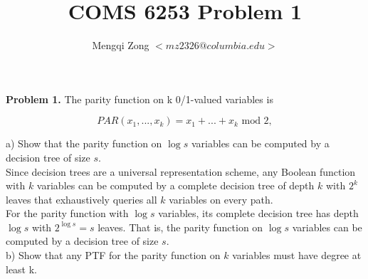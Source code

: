 \documentclass[12pt]{article}
\title{COMS 6253 Problem 1}
\author{Mengqi Zong $<mz2326@columbia.edu>$}
\begin{document}
\maketitle

\setlength{\parindent}{0in}

{\bf Problem 1.} The parity function on k 0/1-valued variables is

\begin{equation*}
PAR(x_1,...,x_k) = x_1 + ... + x_k \text { mod } 2,
\end{equation*}


a)  Show that the parity function on $\log s$ variables can be
computed by a decision tree of size $s$. \\

Since decision trees are a universal representation scheme, any
Boolean function with $k$ variables can be computed by a complete
decision tree of depth $k$ with $2^k$ leaves that exhaustively queries
all $k$ variables on every path. \\

For the parity function with $\log s$ variables, its complete decision
tree has depth $\log s$ with $2^{\log s} = s$ leaves. That is, the
parity function on $\log s$ variables can be computed by a decision
tree of size $s$. \\

b)  Show that any PTF for the parity function on $k$ variables must
have degree at least k. \\
\end{document}

